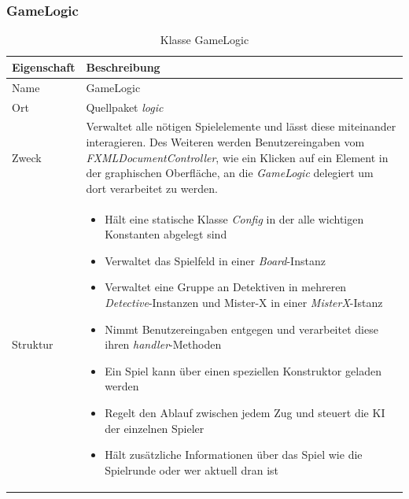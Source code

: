     \subsubsection{GameLogic}
        \begin{table}[H]
            \caption{Klasse GameLogic}
            \begin{tabular}{p{2.5cm}  p{9.5cm}} 
                \hline
                \textbf{Eigenschaft} & \textbf{Beschreibung}\\
                \hline
                Name & GameLogic\\
                Ort & Quellpaket \textit{logic}\\
                \hline
                Zweck &
                Verwaltet alle nötigen Spielelemente und lässt diese miteinander interagieren.
                Des Weiteren werden Benutzereingaben vom \textit{FXMLDocumentController}, wie ein Klicken auf ein Element in der graphischen Oberfläche,
                an die \textit{GameLogic} delegiert um dort verarbeitet zu werden.
                \\
                \hline
                Struktur &
                \begin{itemize}
                    \itemsep0em
                    \item Hält eine statische Klasse \textit{Config} in der alle wichtigen Konstanten abgelegt sind
                    \item Verwaltet das Spielfeld in einer \textit{Board}-Instanz
                    \item Verwaltet eine Gruppe an Detektiven in mehreren \textit{Detective}-Instanzen und Mister-X in einer \textit{MisterX}-Istanz
                    \item Nimmt Benutzereingaben entgegen und verarbeitet diese ihren \textit{handler}-Methoden
                    \item Ein Spiel kann über einen speziellen Konstruktor geladen werden
                    \item Regelt den Ablauf zwischen jedem Zug und steuert die KI der einzelnen Spieler
                    \item Hält zusätzliche Informationen über das Spiel wie die Spielrunde oder wer aktuell dran ist
                \end{itemize}
                \\
                \hline
            \end{tabular}
        \end{table}
